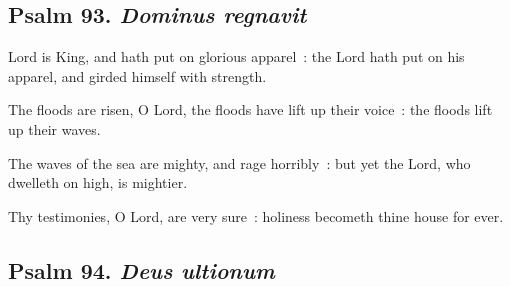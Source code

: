 \subsection{Psalm 93. \textit{Dominus regnavit}}


 Lord is King, and hath put on glorious apparel~: the Lord hath put on his apparel, and girded himself with strength.\par
{}
The floods are risen, O Lord, the floods have lift up their voice~: the floods lift up their waves.\par
{}The waves of the sea are mighty, and rage horribly~: but yet the Lord, who dwelleth on high, is mightier.\par
{}Thy testimonies, O Lord, are very sure~: holiness becometh thine house for ever.\par

\subsection{Psalm 94. \textit{Deus ultionum}}


